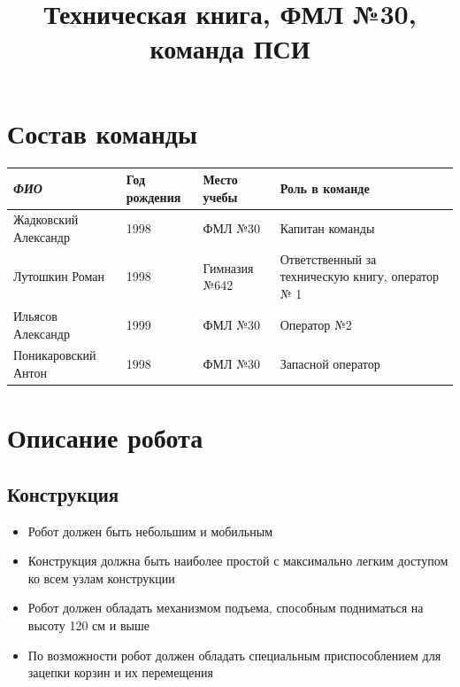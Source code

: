 \documentclass[11pt]{article}
\title{ Техническая книга, ФМЛ №30, команда ПСИ}
\begin{document}
	\maketitle
	\tableofcontents{}
	\newpage
	
	\section{Состав команды}
		\begin{table}[h]
			\begin{tabular}{|l|l|l|l|}
				\hline
				\textit{ФИО}         & Год рождения & Место учебы   & Роль в команде                                   \\ \hline
				Жадковский Александр &  1998            & ФМЛ №30       & Капитан команды                                  \\ \hline
				Лутошкин Роман       &  1998         & Гимназия №642 & Ответственный за техническую книгу, оператор № 1 \\ \hline
				Ильясов Александр    &  1999            & ФМЛ №30       & Оператор №2                                      \\ \hline
				Поникаровский Антон  & 1998         & ФМЛ №30       & Запасной оператор                                \\ \hline
			\end{tabular}
		\end{table}
	\section{Описание робота}
		\subsection{Конструкция}
			\begin{itemize}
				\item Робот должен быть небольшим и мобильным
				\item Конструкция должна быть наиболее простой с максимально легким доступом ко всем узлам конструкции
				\item Робот должен обладать механизмом подъема, способным подниматься на высоту 120 см и выше
				\item По возможности робот должен обладать специальным приспособлением для зацепки корзин и их перемещения
			\end{itemize}
\end{document}
